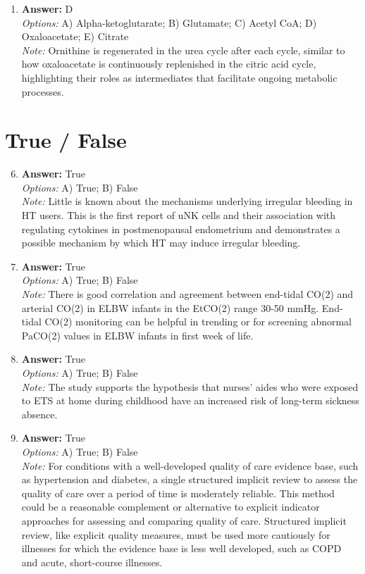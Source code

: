 \documentclass[12pt]{article}
\begin{document}
\begin{enumerate}[label=\arabic*.]
\item \textbf{Answer:} D
\\ \textit{Options:} A) Alpha-ketoglutarate; B) Glutamate; C) Acetyl CoA; D) Oxaloacetate; E) Citrate
\\ \textit{Note:} Ornithine is regenerated in the urea cycle after each cycle, similar to how oxaloacetate is continuously replenished in the citric acid cycle, highlighting their roles as intermediates that facilitate ongoing metabolic processes.
\end{enumerate}

\section*{True / False}
\begin{enumerate}[label=\arabic*.]
\setcounter{enumi}{5}
\item \textbf{Answer:} True
\\ \textit{Options:} A) True; B) False
\\ \textit{Note:} Little is known about the mechanisms underlying irregular bleeding in HT users. This is the first report of uNK cells and their association with regulating cytokines in postmenopausal endometrium and demonstrates a possible mechanism by which HT may induce irregular bleeding.
\item \textbf{Answer:} True
\\ \textit{Options:} A) True; B) False
\\ \textit{Note:} There is good correlation and agreement between end-tidal CO(2) and arterial CO(2) in ELBW infants in the EtCO(2) range 30-50 mmHg. End-tidal CO(2) monitoring can be helpful in trending or for screening abnormal PaCO(2) values in ELBW infants in first week of life.
\item \textbf{Answer:} True
\\ \textit{Options:} A) True; B) False
\\ \textit{Note:} The study supports the hypothesis that nurses' aides who were exposed to ETS at home during childhood have an increased risk of long-term sickness absence.
\item \textbf{Answer:} True
\\ \textit{Options:} A) True; B) False
\\ \textit{Note:} For conditions with a well-developed quality of care evidence base, such as hypertension and diabetes, a single structured implicit review to assess the quality of care over a period of time is moderately reliable. This method could be a reasonable complement or alternative to explicit indicator approaches for assessing and comparing quality of care. Structured implicit review, like explicit quality measures, must be used more cautiously for illnesses for which the evidence base is less well developed, such as COPD and acute, short-course illnesses.

\end{enumerate}
\end{document}
